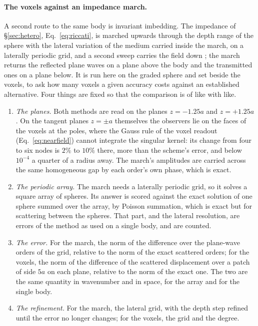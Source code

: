 \documentclass[11pt,a4paper]{article}
\begin{document}
\paragraph{The voxels against an impedance march.} A second route to the same body is invariant
imbedding. The impedance of \S\ref{sec:hetero}, Eq.~\eqref{eq:riccati}, is marched upwards through the
depth range of the sphere with the lateral variation of the medium carried inside the march, on a
laterally periodic grid, and a second sweep carries the field down \citep{Haines2004}; the march
returns the reflected plane waves on a plane above the body and the transmitted ones on a plane below.
It is run here on the graded sphere and set beside the voxels, to ask how many voxels a given accuracy
costs against an established alternative. Four things are fixed so that the comparison is of like with
like.
\begin{enumerate}
\item \emph{The planes.} Both methods are read on the planes $z=-1.25a$ and $z=+1.25a$. On the tangent
planes $z=\pm a$ themselves the observers lie on the faces of the voxels at the poles, where the Gauss
rule of the voxel readout (Eq.~\eqref{eq:nearfield}) cannot integrate the singular kernel: its change
from four to six nodes is $2\%$ to $10\%$ there, more than the scheme's error, and below $10^{-4}$ a
quarter of a radius away. The march's amplitudes are carried across the same homogeneous gap by each
order's own phase, which is exact.
\item \emph{The periodic array.} The march needs a laterally periodic grid, so it solves a square array
of spheres. Its answer is scored against the exact solution of one sphere summed over the array, by
Poisson summation, which is exact but for scattering between the spheres. That part, and the lateral
resolution, are errors of the method as used on a single body, and are counted.
\item \emph{The error.} For the march, the norm of the difference over the plane-wave orders of the
grid, relative to the norm of the exact scattered orders; for the voxels, the norm of the difference of
the scattered displacement over a patch of side $5a$ on each plane, relative to the norm of the exact
one. The two are the same quantity in wavenumber and in space, for the array and for the single body.
\item \emph{The refinement.} For the march, the lateral grid, with the depth step refined until the
error no longer changes; for the voxels, the grid and the degree.
\end{enumerate}
\end{document}

